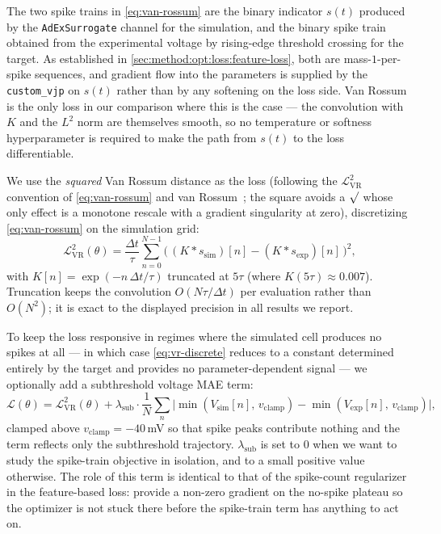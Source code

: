 The two spike trains in \cref{eq:van-rossum} are the binary indicator $s(t)$ produced by the \texttt{AdExSurrogate} channel for the simulation, and the binary spike train obtained from the experimental voltage by rising-edge threshold crossing for the target.
As established in \cref{sec:method:opt:loss:feature-loss}, both are mass-$1$-per-spike sequences, and gradient flow into the parameters is supplied by the \texttt{custom\_vjp} on $s(t)$ rather than by any softening on the loss side.
Van Rossum is the only loss in our comparison where this is the case --- the convolution with $K$ and the $L^2$ norm are themselves smooth, so no temperature or softness hyperparameter is required to make the path from $s(t)$ to the loss differentiable.

We use the \emph{squared} Van Rossum distance as the loss (following the $\mathcal{L}_{\mathrm{VR}}^{2}$ convention of \cref{eq:van-rossum} and van Rossum~\cite{Rossum2001}; the square avoids a $\surd$ whose only effect is a monotone rescale with a gradient singularity at zero), discretizing \cref{eq:van-rossum} on the simulation grid:
\begin{equation}\label{eq:vr-discrete}
    \mathcal{L}_{\mathrm{VR}}^{2}(\theta) = \frac{\Delta t}{\tau} \sum_{n=0}^{N-1} \bigl(\,(K * s_{\mathrm{sim}})[n] - (K * s_{\mathrm{exp}})[n]\,\bigr)^{2},
\end{equation}
with $K[n] = \exp(-n\,\Delta t / \tau)$ truncated at $5\tau$ (where $K(5\tau) \approx 0.007$).
Truncation keeps the convolution $O(N\tau/\Delta t)$ per evaluation rather than $O(N^{2})$; it is exact to the displayed precision in all results we report.

To keep the loss responsive in regimes where the simulated cell produces no spikes at all --- in which case \cref{eq:vr-discrete} reduces to a constant determined entirely by the target and provides no parameter-dependent signal --- we optionally add a subthreshold voltage \gls{MAE} term:
\begin{equation}\label{eq:vr-sub}
    \mathcal{L}(\theta) = \mathcal{L}_{\mathrm{VR}}^{2}(\theta) + \lambda_{\mathrm{sub}} \cdot \frac{1}{N}\sum_{n} \bigl| \min(V_{\mathrm{sim}}[n],\,v_{\mathrm{clamp}}) - \min(V_{\mathrm{exp}}[n],\,v_{\mathrm{clamp}}) \bigr|,
\end{equation}
clamped above $v_{\mathrm{clamp}} = -40$\,mV so that spike peaks contribute nothing and the term reflects only the subthreshold trajectory.
$\lambda_{\mathrm{sub}}$ is set to $0$ when we want to study the spike-train objective in isolation, and to a small positive value otherwise.
The role of this term is identical to that of the spike-count regularizer in the feature-based loss: provide a non-zero gradient on the no-spike plateau so the optimizer is not stuck there before the spike-train term has anything to act on.


